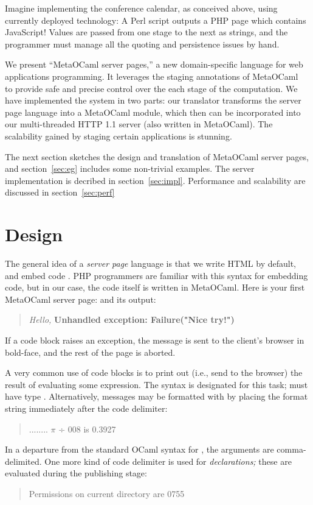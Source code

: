 \documentclass[preprint]{acm_proc_article-sp}
\def\MOC{MetaOCaml}
\begin{document}
Imagine implementing the conference calendar, as conceived
above, using currently deployed technology: A Perl script
outputs a PHP page which contains JavaScript!  Values are
passed from one stage to the next as strings, and the
programmer must manage all the quoting and persistence
issues by hand.

We present ``\MOC{} server pages,'' a new domain-specific
language for web applications programming.  It leverages the
staging annotations of \MOC~\cite{calcagno03meta,taha00metaml}
to provide safe and precise control over the each stage of the
computation.  We have implemented the system in two parts: our
translator transforms the server page language into a \MOC{}
module, which then can be incorporated into our multi-threaded
HTTP 1.1 server (also written in \MOC{}).  The scalability
gained by staging certain applications is stunning.

The next section sketches the design and translation of \MOC{}
server pages, and section~\ref{sec:eg} includes some non-trivial
examples.  The server implementation is decribed in
section~\ref{sec:impl}.  Performance and scalability are
discussed in section~\ref{sec:perf}

\section{Design}
\label{sec:design}

The general idea of a \emph{server page} language is that we
  write HTML by default, and embed code %
.
PHP programmers are familiar with this syntax for embedding code, but
in our case, the code itself is written in \MOC.  Here is your first
\MOC{} server page:
and its output:
\begin{quote}
  \textit{Hello,} \textbf{Unhandled exception: Failure("Nice try!")}
\end{quote}
If a code block raises an exception, the message is sent to the
client's browser in bold-face, and the rest of the page is
aborted. 

A very common use of code blocks is to print out (i.e., send to
the browser) the result of evaluating some expression.  The
syntax  is designated for this task;  must
have type .  Alternatively, messages may be formatted
with  by placing the format string immediately after
the code delimiter: 
\begin{quote}
  ........ $\pi$ ÷ 008 is 0.3927
\end{quote}
In a departure from the standard OCaml syntax for , the
arguments are comma-delimited.
One more kind of code delimiter is used for \emph{declarations;}
these are evaluated during the publishing stage:
\begin{quote}
Permissions on current directory are 0755
\end{quote}
\end{document}
